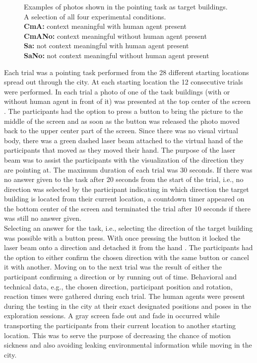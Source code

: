 \begin{figure}[h!]
	\caption{Examples of photos shown in the pointing task as target buildings. A selection of all four experimental conditions.\\
	\scriptsize{
		\textbf{CmA:}   context meaningful with human agent present\\
		\textbf{CmANo:} context meaningful without human agent present\\
		\textbf{Sa:}    not context meaningful with human agent present\\
		\textbf{SaNo:}  not context meaningful without human agent present}
}
	\label{fig:target_photos}
\end{figure}


Each trial was a pointing task performed from the 28 different starting locations spread out through the city. At each starting location the 12 consecutive trials were performed. In each trial a photo of one of the task buildings (with or without human agent in front of it) was presented at the top center of the screen . The participants had the option to press a button to bring the picture to the middle of the screen  and as soon as the button was released the photo moved back to the upper center part of the screen. Since there was no visual virtual body, there was a green dashed laser beam  attached to the virtual hand of the participants that moved as they moved their hand. The purpose of the laser beam was to assist the participants with the visualization of the direction they are pointing at. The maximum duration of each trial was 30 seconds. If there was no answer given to the task after 20 seconds from the start of the trial, i.e., no direction was selected by the participant indicating in which direction the target building is located from their current location, a countdown timer appeared on the bottom center of the screen  and terminated the trial after 10 seconds if there was still no answer given. \\

Selecting an answer for the task, i.e., selecting the direction of the target building was possible with a button press. With once pressing the button it locked the laser beam onto a direction and detached it from the hand . The participants had the option to either confirm the chosen direction with the same button or cancel it with another. Moving on to the next trial was the result of either the participant confirming a direction or by running out of time. Behavioral and technical data, e.g., the chosen direction, participant position and rotation, reaction times were gathered during each trial. The human agents were present during the testing in the city at their exact designated positions and poses in the exploration sessions. A gray screen fade out and fade in occurred while transporting the participants from their current location to another starting location. This was to serve the purpose of decreasing the chance of motion sickness and also avoiding leaking environmental information while moving in the city.


